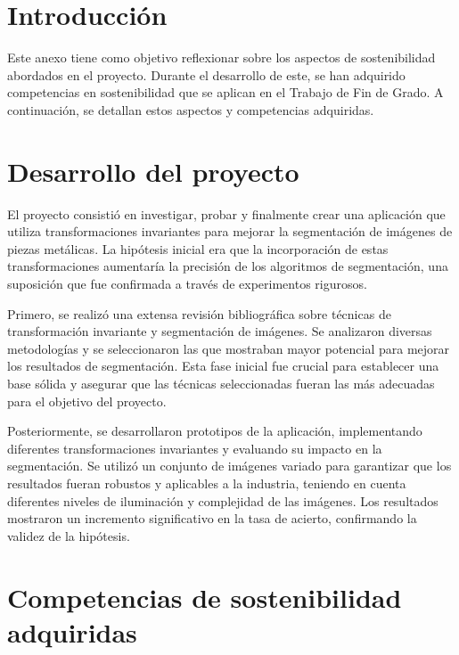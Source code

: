 
\section{Introducción}\label{introduccion-ods}

Este anexo tiene como objetivo reflexionar sobre los aspectos de sostenibilidad abordados en el proyecto. Durante el desarrollo de este, se han adquirido competencias en sostenibilidad que se aplican en el Trabajo de Fin de Grado. A continuación, se detallan estos aspectos y competencias adquiridas.

\section{Desarrollo del proyecto}\label{desarrollo-del-proyecto-ods}

El proyecto consistió en investigar, probar y finalmente crear una aplicación que utiliza transformaciones invariantes para mejorar la segmentación de imágenes de piezas metálicas. La hipótesis inicial era que la incorporación de estas transformaciones aumentaría la precisión de los algoritmos de segmentación, una suposición que fue confirmada a través de experimentos rigurosos.

Primero, se realizó una extensa revisión bibliográfica sobre técnicas de transformación invariante y segmentación de imágenes. Se analizaron diversas metodologías y se seleccionaron las que mostraban mayor potencial para mejorar los resultados de segmentación. Esta fase inicial fue crucial para establecer una base sólida y asegurar que las técnicas seleccionadas fueran las más adecuadas para el objetivo del proyecto.

Posteriormente, se desarrollaron prototipos de la aplicación, implementando diferentes transformaciones invariantes y evaluando su impacto en la segmentación. Se utilizó un conjunto de imágenes variado para garantizar que los resultados fueran robustos y aplicables a la industria, teniendo en cuenta diferentes niveles de iluminación y complejidad de las imágenes. Los resultados mostraron un incremento significativo en la tasa de acierto, confirmando la validez de la hipótesis.

\section{Competencias de sostenibilidad adquiridas}\label{competencias-de-sostenibilidad-adquiridas-ods}

